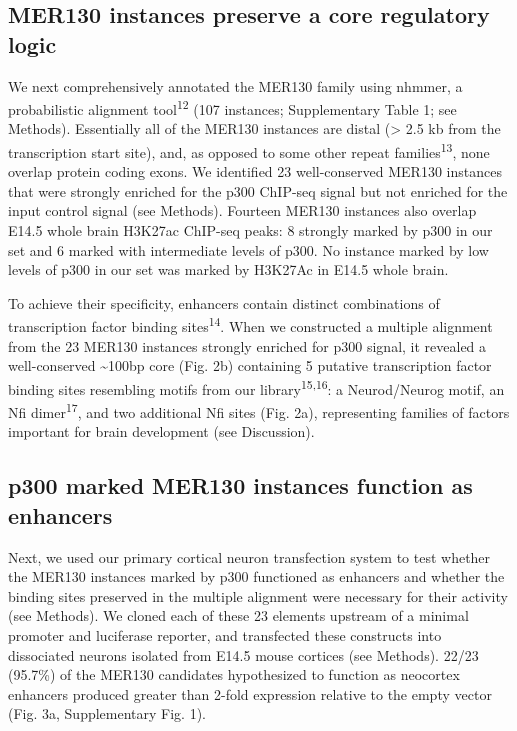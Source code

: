 \documentclass[]{article}
\begin{document}
\subsection{MER130 instances preserve a core regulatory
logic}\label{mer130-instances-preserve-a-core-regulatory-logic}

We next comprehensively annotated the MER130 family using nhmmer, a
probabilistic alignment tool\textsuperscript{12} (107 instances;
Supplementary Table 1; see Methods). Essentially all of the MER130
instances are distal (\textgreater{} 2.5 kb from the transcription start
site), and, as opposed to some other repeat
families\textsuperscript{13}, none overlap protein coding exons. We
identified 23 well-conserved MER130 instances that were strongly
enriched for the p300 ChIP-seq signal but not enriched for the input
control signal (see Methods). Fourteen MER130 instances also overlap
E14.5 whole brain H3K27ac ChIP-seq peaks: 8 strongly marked by p300 in
our set and 6 marked with intermediate levels of p300. No instance
marked by low levels of p300 in our set was marked by H3K27Ac in E14.5
whole brain.

To achieve their specificity, enhancers contain distinct combinations of
transcription factor binding sites\textsuperscript{14}. When we
constructed a multiple alignment from the 23 MER130 instances strongly
enriched for p300 signal, it revealed a well-conserved
\textasciitilde{}100bp core (Fig. 2b) containing 5 putative
transcription factor binding sites resembling motifs from our
library\textsuperscript{15,16}: a Neurod/Neurog motif, an Nfi
dimer\textsuperscript{17}, and two additional Nfi sites (Fig. 2a),
representing families of factors important for brain development (see
Discussion).

\subsection{p300 marked MER130 instances function as
enhancers}\label{p300-marked-mer130-instances-function-as-enhancers}

Next, we used our primary cortical neuron transfection system to test
whether the MER130 instances marked by p300 functioned as enhancers and
whether the binding sites preserved in the multiple alignment were
necessary for their activity (see Methods). We cloned each of these 23
elements upstream of a minimal promoter and luciferase reporter, and
transfected these constructs into dissociated neurons isolated from
E14.5 mouse cortices (see Methods). 22/23 (95.7\%) of the MER130
candidates hypothesized to function as neocortex enhancers produced
greater than 2-fold expression relative to the empty vector (Fig. 3a,
Supplementary Fig. 1).
\end{document}
